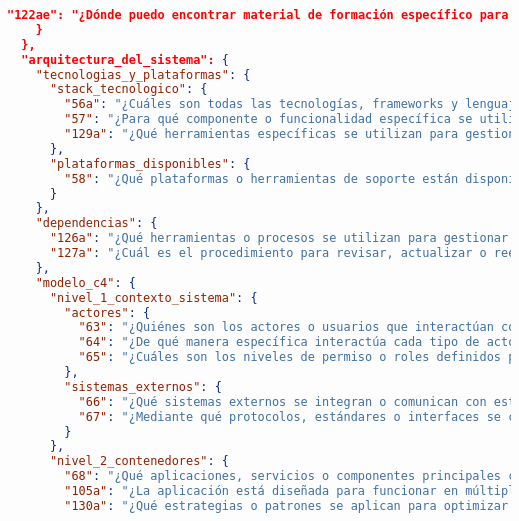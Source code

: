 \begin{lstlisting}[language=json, caption={Listado de elicitación de preguntas procesadas y clasificadas}, label={listado:preguntas}]
      "122ae": "¿Dónde puedo encontrar material de formación específico para las tecnologías utilizadas en este proyecto?"
    }
  },
  "arquitectura_del_sistema": {
    "tecnologias_y_plataformas": {
      "stack_tecnologico": {
        "56a": "¿Cuáles son todas las tecnologías, frameworks y lenguajes utilizados en el proyecto?",
        "57": "¿Para qué componente o funcionalidad específica se utiliza cada tecnología del proyecto?",
        "129a": "¿Qué herramientas específicas se utilizan para gestionar las migraciones de esquemas de base de datos?"
      },
      "plataformas_disponibles": {
        "58": "¿Qué plataformas o herramientas de soporte están disponibles para el proyecto (diseño, colaboración, monitoreo)?"
      }
    },
    "dependencias": {
      "126a": "¿Qué herramientas o procesos se utilizan para gestionar las dependencias en este proyecto?",
      "127a": "¿Cuál es el procedimiento para revisar, actualizar o reemplazar dependencias vulnerables o desactualizadas?"
    },
    "modelo_c4": {
      "nivel_1_contexto_sistema": {
        "actores": {
          "63": "¿Quiénes son los actores o usuarios que interactúan con el sistema?",
          "64": "¿De qué manera específica interactúa cada tipo de actor con el sistema?",
          "65": "¿Cuáles son los niveles de permiso o roles definidos para cada tipo de actor en el sistema?"
        },
        "sistemas_externos": {
          "66": "¿Qué sistemas externos se integran o comunican con este sistema?",
          "67": "¿Mediante qué protocolos, estándares o interfaces se conectan los sistemas externos?"
        }
      },
      "nivel_2_contenedores": {
        "68": "¿Qué aplicaciones, servicios o componentes principales conforman el sistema y cuál es la función de cada uno?",
        "105a": "¿La aplicación está diseñada para funcionar en múltiples plataformas o dispositivos? ¿Cuáles?",
        "130a": "¿Qué estrategias o patrones se aplican para optimizar el rendimiento de las consultas a bases de datos?",


\end{lstlisting}
